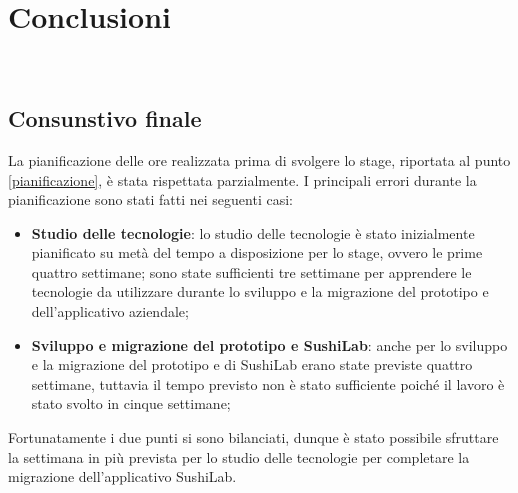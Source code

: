 \chapter{Conclusioni}
\label{conclusioni}
\\
\section{Consunstivo finale}
La pianificazione delle ore realizzata prima di svolgere lo stage, riportata al punto \ref{pianificazione}, è stata rispettata parzialmente. I principali errori durante la pianificazione sono stati fatti nei seguenti casi:
\begin{itemize}
  \item \textbf{Studio delle tecnologie}: lo studio delle tecnologie è stato inizialmente pianificato su metà del tempo a disposizione per lo stage, ovvero le prime quattro settimane; sono state sufficienti tre settimane per apprendere le tecnologie da utilizzare durante lo sviluppo e la migrazione del prototipo e dell'applicativo aziendale;
  \item \textbf{Sviluppo e migrazione del prototipo e SushiLab}: anche per lo sviluppo e la migrazione del prototipo e di SushiLab erano state previste quattro settimane, tuttavia il tempo previsto non è stato sufficiente poiché il lavoro è stato svolto in cinque settimane;
\end{itemize}
Fortunatamente i due punti si sono bilanciati, dunque è stato possibile sfruttare la settimana in più prevista per lo studio delle tecnologie per completare la migrazione dell'applicativo SushiLab.
